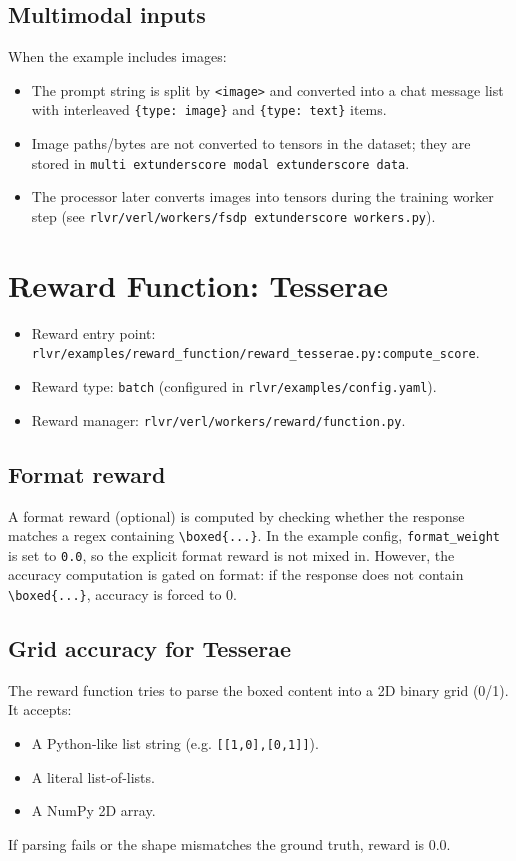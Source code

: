 \documentclass[11pt]{article}
\begin{document}
\subsection{Multimodal inputs}
When the example includes images:
\begin{itemize}
  \item The prompt string is split by \texttt{<image>} and converted into a chat message list with interleaved \texttt{\{type: image\}} and \texttt{\{type: text\}} items.
  \item Image paths/bytes are not converted to tensors in the dataset; they are stored in \texttt{multi	extunderscore modal	extunderscore data}.
  \item The processor later converts images into tensors during the training worker step (see \texttt{rlvr/verl/workers/fsdp	extunderscore workers.py}).
\end{itemize}

\section{Reward Function: Tesserae}
\begin{itemize}
  \item Reward entry point: \texttt{rlvr/examples/reward\_function/reward\_tesserae.py:compute\_score}.
  \item Reward type: \texttt{batch} (configured in \texttt{rlvr/examples/config.yaml}).
  \item Reward manager: \texttt{rlvr/verl/workers/reward/function.py}.
\end{itemize}

\subsection{Format reward}
A format reward (optional) is computed by checking whether the response matches a regex containing \texttt{\textbackslash boxed\{...\}}. In the example config, \texttt{format\_weight} is set to \texttt{0.0}, so the explicit format reward is not mixed in. However, the accuracy computation is gated on format: if the response does not contain \texttt{\textbackslash boxed\{...\}}, accuracy is forced to \(0\).

\subsection{Grid accuracy for Tesserae}
The reward function tries to parse the boxed content into a 2D binary grid (0/1). It accepts:
\begin{itemize}
  \item A Python-like list string (e.g. \texttt{[[1,0],[0,1]]}).
  \item A literal list-of-lists.
  \item A NumPy 2D array.
\end{itemize}
If parsing fails or the shape mismatches the ground truth, reward is \(0.0\).
\end{document}
